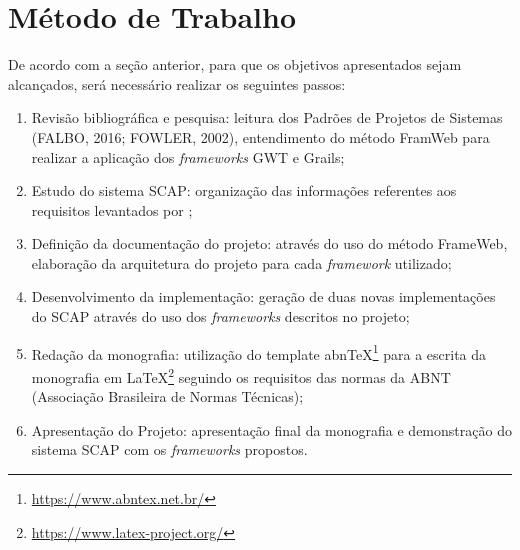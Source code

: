
\section{Método de Trabalho}
\label{sec-metodo}


	
	

De acordo com a seção anterior, para que os objetivos apresentados sejam alcançados, será necessário realizar os seguintes passos:

\begin{enumerate}

    \item Revisão bibliográfica e pesquisa: leitura dos Padrões de Projetos de Sistemas (FALBO, 2016; FOWLER, 2002), entendimento do método FramWeb \cite{souza:masterthesis07} para realizar a aplicação dos \textit{frameworks} GWT e Grails;
    \item Estudo do sistema SCAP: organização das informações referentes aos requisitos levantados por ;
    \item Definição da documentação do projeto: através do uso do método FrameWeb, elaboração da arquitetura do projeto para cada \textit{framework} utilizado;
    \item Desenvolvimento da implementação: geração de duas novas implementações do SCAP através do uso dos \textit{frameworks} descritos no projeto; 
    \item Redação da monografia: utilização do template abnTeX\footnote{\url{https://www.abntex.net.br/}} para a escrita da monografia em LaTeX\footnote{\url{https://www.latex-project.org/}} seguindo os requisitos das normas da ABNT (Associação Brasileira de Normas Técnicas);
    \item Apresentação do Projeto: apresentação final da monografia e demonstração do sistema SCAP com os \textit{frameworks} propostos.

\end{enumerate}    
    
